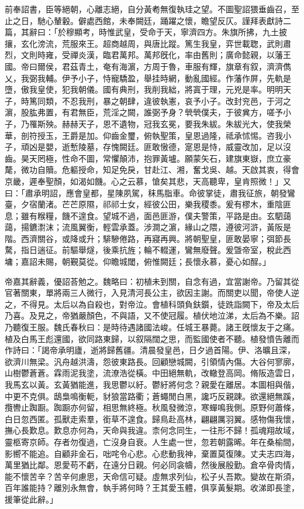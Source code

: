 \begin{pinyinscope}
前奉詔書，臣等絕朝，心離志絕，自分黃耇無復執珪之望。不圖聖詔猥垂齒召，至止之日，馳心輦轂。僻處西館，未奉闕廷，踊躍之懷，瞻望反仄。謹拜表獻詩二篇，其辭曰：「於穆顯考，時惟武皇，受命于天，寧濟四方。朱旗所拂，九土披攘，玄化滂流，荒服來王。超商越周，與唐比蹤。篤生我皇，弈世載聦，武則肅烈，文則時雍，受禪炎漢，臨君萬邦。萬邦旣化，率由舊則；廣命懿親，以藩王國。帝曰爾侯，君茲青土，奄有海濵，方周于魯，車服有輝，旗章有叙，濟濟儁乂，我弼我輔。伊予小子，恃寵驕盈，舉挂時網，動亂國經。作藩作屏，先軌是墮，傲我皇使，犯我朝儀。國有典刑，我削我絀，將寘于理，元兇是率。明明天子，時篤同類，不忍我刑，暴之朝肆，違彼執憲，哀予小子。改封兖邑，于河之濵，股肱弗置，有君無臣，荒淫之闕，誰弼予身？煢煢僕夫，于彼兾方，嗟予小子，乃罹斯殃。赫赫天子，恩不遺物，冠我玄冕，要我朱紱。朱紱光大，使我榮華，剖符授玉，王爵是加。仰齒金璽，俯執聖策，皇恩過隆，祗承怵惕。咨我小子，頑凶是嬰，逝慙陵墓，存愧闕廷。匪敢慠德，寔恩是恃，威靈改加，足以沒齒。昊天罔極，性命不圖，常懼顛沛，抱罪黃壚。願蒙矢石，建旗東嶽，庶立豪氂，微功自贖。危軀授命，知足免戾，甘赴江、湘，奮戈吳、越。天啟其衷，得會京畿，遲奉聖顏，如渴如饑。心之云慕，愴矣其悲，天高聽卑，皇肯照微！」又曰：「肅承明詔，應會皇都，星陳夙駕，秣馬脂車。命彼掌徒，肅我征旅，朝發鸞臺，夕宿蘭渚。芒芒原隰，祁祁士女，經彼公田，樂我稷黍。爰有樛木，重陰匪息；雖有糇糧，饑不遑食。望城不過，面邑匪游，僕夫警策，平路是由。玄駟藹藹，揚鑣㵱沫；流風翼衡，輕雲承蓋。涉澗之濵，緣山之隈，遵彼河滸，黃阪是階。西濟關谷，或降或升；騑驂倦路，再寢再興。將朝聖皇，匪敢晏寧；弭節長騖，指日遄征。前驅舉燧，後乘抗旌；輪不輟運，鸞無廢聲。爰曁帝室，稅此西墉；嘉詔未賜，朝覲莫從。仰瞻城閾，俯惟闕廷；長懷永慕，憂心如酲。」

帝嘉其辭義，優詔荅勉之。魏略曰：初植未到關，自念有過，宜當謝帝。乃留其從官著關東，單將兩三人微行，入見清河長公主，欲因主謝。而關吏以聞，帝使人逆之，不得見。太后以為自殺也，對帝泣。會植科頭負鈇鑕，徒跣詣闕下，帝及太后乃喜。及見之，帝猶嚴顏色，不與語，又不使冠履。植伏地泣涕，太后為不樂。詔乃聽復王服。魏氏春秋曰：是時待遇諸國法峻。任城王暴薨。諸王旣懷友于之痛。植及白馬王彪還國，欲同路東歸，以叙隔闊之思，而監國使者不聽。植發憤告離而作詩曰：「謁帝承明廬，逝將歸舊疆。清晨發皇邑，日夕過首陽。伊、洛曠且深，欲濟川無梁。汎舟越洪濤，怨彼東路長。回顧戀城闕，引領情內傷。大谷何寥廓，山樹鬱蒼蒼。霖雨泥我塗，流潦浩從橫。中田絕無軌，改轍登高岡。脩阪造雲日，我馬玄以黃。玄黃猶能進，我思鬱以紆。鬱紆將何念？親愛在離居。本圖相與偕，中更不克俱。鴟梟鳴衡軛，豺狼當路衢；蒼蠅閒白黑，讒巧反親踈。欲還絕無蹊，攬轡止踟蹰。踟蹰亦何留，相思無終極。秋風發微涼，寒蟬鳴我側。原野何蕭條，白日忽西匿。孤獸走索羣，銜草不遑食。歸鳥赴高林，翩翩厲羽翼。感物傷我懷，撫心長歎息。歎息亦何為，天命與我違。柰何念同生，一往形不歸！孤魂翔故域，靈柩寄京師。存者勿復過，亡沒身自衰。人生處一世，忽若朝露晞。年在桑榆間，影嚮不能追。自顧非金石，咄咤令心悲。心悲動我神，棄置莫復陳。丈夫志四海，萬里猶比鄰。恩愛苟不虧，在遠分日親。何必同衾幬，然後展殷勤。倉卒骨肉情，能不懷苦辛？苦辛何慮思，天命信可疑。虛無求列仙，松子乆吾欺。變故在斯須，百年誰能持？離別永無會，執手將何時？王其愛玉體，俱享黃髮期。收涕即長塗，援筆從此辭。」


\end{pinyinscope}
